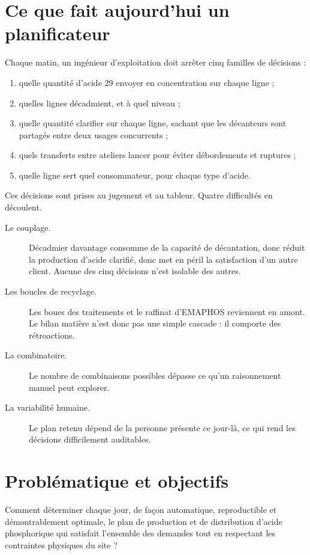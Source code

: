 \section{Ce que fait aujourd'hui un planificateur}

Chaque matin, un ingénieur d'exploitation doit arrêter cinq familles de décisions :

\begin{enumerate}
  \item quelle quantité d'acide 29 envoyer en concentration sur chaque ligne ;
  \item quelles lignes décadmient, et à quel niveau ;
  \item quelle quantité clarifier sur chaque ligne, sachant que les décanteurs sont partagés
        entre deux usages concurrents ;
  \item quels transferts entre ateliers lancer pour éviter débordements et ruptures ;
  \item quelle ligne sert quel consommateur, pour chaque type d'acide.
\end{enumerate}

Ces décisions sont prises au jugement et au tableur. Quatre difficultés en découlent.

\begin{description}
  \item[Le couplage.] Décadmier davantage consomme de la capacité de décantation, donc
        réduit la production d'acide clarifié, donc met en péril la satisfaction d'un autre
        client. Aucune des cinq décisions n'est isolable des autres.
  \item[Les boucles de recyclage.] Les boues des traitements et le raffinat d'EMAPHOS
        reviennent en amont. Le bilan matière n'est donc pas une simple cascade : il comporte
        des rétroactions.
  \item[La combinatoire.] Le nombre de combinaisons possibles dépasse ce qu'un raisonnement
        manuel peut explorer.
  \item[La variabilité humaine.] Le plan retenu dépend de la personne présente ce jour-là,
        ce qui rend les décisions difficilement auditables.
\end{description}

\section{Problématique et objectifs}

\begin{encadre}[title={Problématique}]
Comment déterminer chaque jour, de façon automatique, reproductible et démontrablement
optimale, le plan de production et de distribution d'acide phosphorique qui satisfait
l'ensemble des demandes tout en respectant les contraintes physiques du site ?
\end{encadre}

